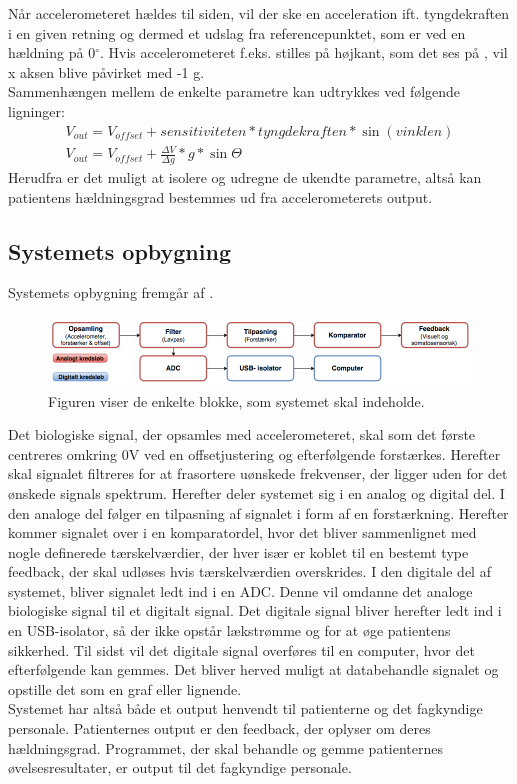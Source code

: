 Når accelerometeret hældes til siden, vil der ske en acceleration ift. tyngdekraften i en given retning og dermed et udslag fra referencepunktet, som er ved en hældning på 0$^{\circ}$. Hvis accelerometeret f.eks. stilles på højkant, som det ses på , vil x aksen blive påvirket med -1 g.\cite{Devices2009} \\
Sammenhængen mellem de enkelte parametre kan udtrykkes ved følgende ligninger:\\ 
\begin{align}
	V_{out} = V_{offset} + sensitiviteten * tyngdekraften * \sin(vinklen) \\
	V_{out} = V_{offset} + \frac{\Delta V}{\Delta g} * g * \sin \Theta
\end{align}
Herudfra er det muligt at isolere og udregne de ukendte parametre, altså kan patientens hældningsgrad bestemmes ud fra accelerometerets output.

\subsection{Systemets opbygning}\label{ref:blokdiagram} 
Systemets opbygning fremgår af .

\begin{figure}[H]
	\centering
	\includegraphics[scale=0.5]{figures/cProblemloesning/Blokdiagram.PNG}
	\caption{Figuren viser de enkelte blokke, som systemet skal indeholde.}
	\label{kravblok}
\end{figure}
Det biologiske signal, der opsamles med accelerometeret, skal som det første centreres omkring $0$V ved en offsetjustering og efterfølgende forstærkes. Herefter skal signalet filtreres for at frasortere uønskede frekvenser, der ligger uden for det ønskede signals spektrum. Herefter deler systemet sig i en analog og digital del. I den analoge del følger en tilpasning af signalet i form af en forstærkning. Herefter kommer signalet over i en komparatordel, hvor det bliver sammenlignet med nogle definerede tærskelværdier, der hver især er koblet til en bestemt type feedback, der skal udløses hvis tærskelværdien overskrides. 
I den digitale del af systemet, bliver signalet ledt ind i en ADC. Denne vil omdanne det analoge biologiske signal til et digitalt signal. Det digitale signal bliver herefter ledt ind i en USB-isolator, så der ikke opstår lækstrømme og for at øge patientens sikkerhed. Til sidst vil det digitale signal overføres til en computer, hvor det efterfølgende kan gemmes. Det bliver herved muligt at databehandle signalet og opstille det som en graf eller lignende. \\
Systemet har altså både et output henvendt til patienterne og det fagkyndige personale. Patienternes output er den feedback, der oplyser om deres hældningsgrad. Programmet, der skal behandle og gemme patienternes øvelsesresultater, er output til det fagkyndige personale.

